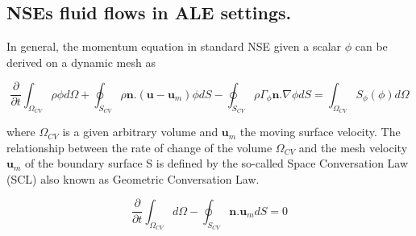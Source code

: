\documentclass[10pt,a4paper,twoside]{article}
\begin{document}
\subsection{NSEs fluid flows in ALE settings.}

In general, the momentum equation in standard NSE given  a scalar $\phi $ can be derived on a dynamic mesh as

\begin{equation}\label{momentum}
\frac{\partial}{\partial t}\int_{\Omega_{CV}}^{}\rho \phi d\Omega + \oint_{S_{CV}} \rho \textbf{n}.(\textbf{u}-\textbf{u}_m)\phi dS - \oint_{S_{CV}} \rho \Gamma_{\phi} \textbf{n}.\nabla \phi dS = \int_{\Omega_{CV}} S_{\phi} (\phi) d\Omega
\end{equation}

where $\Omega_{CV}$ is a given arbitrary volume and $\textbf{u}_m$ the moving surface velocity. The relationship between the rate of change of the volume $\Omega_{CV}$ and the mesh velocity $\textbf{u}_m$  of the boundary surface S is defined by the so-called Space Conversation Law (SCL) also known as Geometric Conversation Law.

\begin{equation}
\frac{\partial}{\partial t}\int_{\Omega_{CV}}^{} d\Omega - \oint_{S_{CV}} \textbf{n}.\textbf{u}_m dS  = 0
\end{equation}
\end{document}
